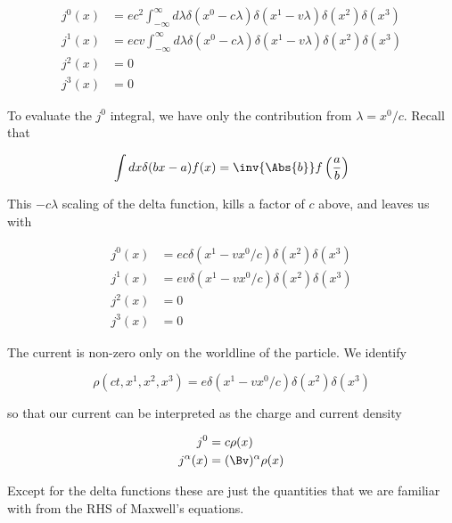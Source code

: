 \begin{equation}\label{eqn:relativisticElectrodynamicsL12:490}
\begin{aligned}
j^0(x) &= e c^2  \int_{-\infty}^\infty d\lambda \delta(x^0 -  c \lambda) \delta(x^1 -  v \lambda) \delta(x^2) \delta(x^3) \\
j^1(x) &= e c v  \int_{-\infty}^\infty d\lambda \delta(x^0 -  c \lambda) \delta(x^1 -  v \lambda) \delta(x^2) \delta(x^3) \\
j^2(x) &= 0 \\
j^3(x) &= 0
\end{aligned}
\end{equation}

To evaluate the $j^0$ integral, we have only the contribution from $\lambda = x^0/ c$.  Recall that 

\begin{equation}\label{eqn:relativisticElectrodynamicsL12:510}
\int dx \delta( b x - a) f(x) = \inv{\Abs{b}} f\left( \frac{a}{b} \right)
\end{equation}

This $- c\lambda$ scaling of the delta function, kills a factor of $c $ above, and leaves us with

\begin{equation}\label{eqn:relativisticElectrodynamicsL12:530}
\begin{aligned}
j^0(x) &= e c \delta(x^1 - v x^0/c) \delta(x^2) \delta(x^3) \\
j^1(x) &= e v \delta(x^1 - v x^0/c) \delta(x^2) \delta(x^3) \\
j^2(x) &= 0 \\
j^3(x) &= 0 
\end{aligned}
\end{equation}

The current is non-zero only on the worldline of the particle.  We identify

\begin{equation}\label{eqn:relativisticElectrodynamicsL12:550}
\rho(ct, x^1, x^2, x^3) = e \delta(x^1 - v x^0/c) \delta(x^2) \delta(x^3) 
\end{equation}

so that our current can be interpreted as the charge and current density 

\begin{equation}\label{eqn:relativisticElectrodynamicsL12:570}
\begin{aligned}
j^0 &= c \rho(x) \\
j^\alpha(x) &= (\Bv)^\alpha \rho(x)
\end{aligned}
\end{equation}

Except for the delta functions these are just the quantities that we are familiar with from the RHS of Maxwell's equations.
